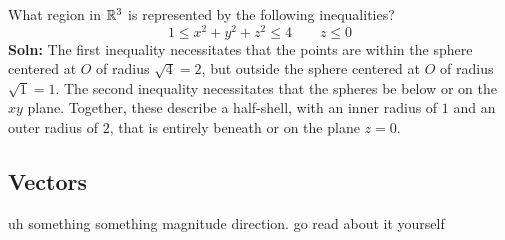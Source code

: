 \begin{example}
    What region in \(\mathbb{R}^3\) is represented by the following inequalities?
    \[1\leq x^2+y^2+z^2\leq 4\qquad z\leq 0\] \textbf{Soln:} The first inequality necessitates that the points are within the sphere centered at \(O\) of radius \(\sqrt 4= 2\), but outside the sphere centered at \(O\) of radius \(\sqrt 1 = 1\). The second inequality necessitates that the spheres be below or on the \(xy\) plane. Together, these describe a half-shell, with an inner radius of \(1\) and an outer radius of \(2\), that is entirely beneath or on the plane \(z=0\).
\end{example}
\subsection{Vectors}
uh something something magnitude direction. go read about it yourself
